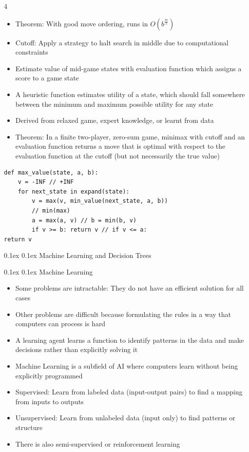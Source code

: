 \documentclass[10pt, landscape]{article}
\makeatletter
\renewcommand{\section}{\@startsection{section}{1}{0mm}%
  {0.1ex} %
  {0.1ex} %
  {\normalfont\large\bfseries}}
\renewcommand{\subsection}{\@startsection{subsection}{2}{0mm}%
  {0.1ex} %
  {0.1ex} %
  {\normalfont\normalsize\bfseries}}
\makeatother
\begin{document}
\begin{multicols*}{4}
\begin{itemize}
    \item Theorem: With good move ordering, runs in $O(b^{\frac{m}{2}})$
    \item Cutoff: Apply a strategy to halt search in middle due to computational constraints
    \item Estimate value of mid-game states with evaluation function which assigns a score to a game state
    \item A heuristic function estimates utility of a state, which should fall somewhere between the minimum and maximum possible utility for any state
    \item Derived from relaxed game, expert knowledge, or learnt from data
    \item Theorem: In a finite two-player, zero-sum game, minimax with cutoff and an evaluation function returns a move that is optimal with respect to the evaluation function at the cutoff (but not necessarily the true value)
\end{itemize}

\begin{verbatim}
def max_value(state, a, b):
    v = -INF // +INF
    for next_state in expand(state):
        v = max(v, min_value(next_state, a, b))
        // min(max)
        a = max(a, v) // b = min(b, v)
        if v >= b: return v // if v <= a:
return v
\end{verbatim}

\section{Machine Learning and Decision Trees}

\subsection{Machine Learning}
\begin{itemize}
    \item Some problems are intractable: They do not have an efficient solution for all cases
    \item Other problems are difficult because formulating the rules in a way that computers can process is hard
    \item A learning agent learns a function to identify patterns in the data and make decisions rather than explicitly solving it
    \item Machine Learning is a subfield of AI where computers learn without being explicitly programmed
    \item Supervised: Learn from labeled data (input-output pairs) to find a mapping from inputs to outputs
    \item Unsupervised: Learn from unlabeled data (input only) to find patterns or structure
    \item There is also semi-supervised or reinforcement learning
\end{itemize}


\end{multicols*}
\end{document}
